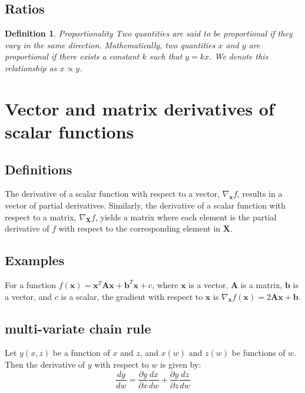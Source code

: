 \documentclass[11pt]{book} %
\newtheorem{definition}{Definition}[section]
\begin{document}
\subsection{Ratios}
\begin{definition}{Proportionality}
    Two quantities are said to be proportional if they vary in the same direction. 
    Mathematically, two quantities \(x\) and \(y\) are proportional if there exists a constant \(k\) such that \(y = kx\).
    We denote this relationship as \(x \propto y\).
\end{definition}

\section{Vector and matrix derivatives of scalar functions}

\subsection{Definitions}

The derivative of a scalar function with respect to a vector, \(\nabla_{\mathbf{x}} f\), 
results in a vector of partial derivatives. Similarly, the derivative of a scalar function with respect to a matrix, \(\nabla_{\mathbf{X}} f\), 
yields a matrix where each element is the partial derivative of \(f\) with respect to the corresponding element in \(\mathbf{X}\).

\subsection{Examples}

For a function \(f(\mathbf{x}) = \mathbf{x}^T\mathbf{A}\mathbf{x} + \mathbf{b}^T\mathbf{x} + c\), where \(\mathbf{x}\) is a vector,
 \(\mathbf{A}\) is a matrix, \(\mathbf{b}\) is a vector, and \(c\) is a scalar, the gradient with respect to \(\mathbf{x}\) is 
 \(\nabla_{\mathbf{x}} f(\mathbf{x}) = 2\mathbf{A}\mathbf{x} + \mathbf{b}\).

\subsection{multi-variate chain rule} \label{ssec:chain_rule}
Let $y(x,z)$ be a function of $x$ and $z$, and $x(w)$ and $z(w)$ be functions of $w$. 
Then the derivative of $y$ with respect to $w$ is given by:
\begin{equation}
    \frac{dy}{dw} = \frac{\partial y}{\partial x} \frac{dx}{dw} + \frac{\partial y}{\partial z} \frac{dz}{dw}
\end{equation}
\end{document}
